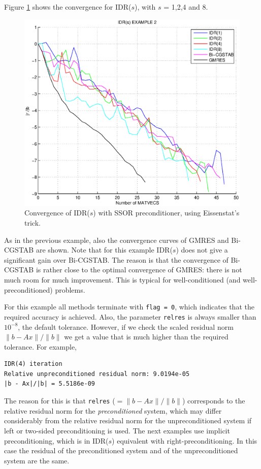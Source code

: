 \documentclass[prodmode,acmtoms]{acmsmall}
\begin{document}
Figure \ref{fig:example2} shows the convergence for IDR($s$), with $s$ = 1,2,4 and 8.
\begin{figure}
\centering
\includegraphics[width=.60\linewidth]{example2}
\caption{Convergence of IDR($s$) with SSOR preconditioner, using Eissenstat's trick.}
\label{fig:example2}
\end{figure}
As in the previous example, also the convergence curves of GMRES and Bi-CGSTAB are shown. Note that for this example
IDR($s$) does not give a significant gain over Bi-CGSTAB. The reason is that the convergence
of Bi-CGSTAB is rather close to the optimal convergence of GMRES: there is not much room for much improvement. This is
typical for well-conditioned (and well-preconditioned) problems.

For this example all methods terminate with {\tt flag = 0}, which indicates that the required accuracy is achieved.
Also, the parameter {\tt relres} is always smaller than $10^{-8}$, the default tolerance. However, if we check the
scaled residual norm $\|b - Ax\|/\|b\|$ we get a value that is much higher than the required tolerance. For example,
\begin{verbatim}
IDR(4) iteration
Relative unpreconditioned residual norm: 9.0194e-05 
|b - Ax|/|b| = 5.5186e-09
\end{verbatim}
The reason for this is that {\tt relres} ($= \|b - Ax\|/\|b\|$) corresponds to the relative residual norm for
the \emph{preconditioned} system, which may differ considerably from the relative residual norm for the
unpreconditioned system if left or two-sided preconditioning is used. The next examples use implicit preconditioning, 
which is in IDR($s$) equivalent with right-preconditioning. In this case the residual of the preconditioned system 
and of the unpreconditioned system are the same.
\end{document}
